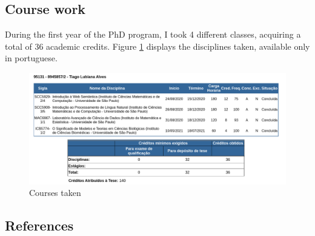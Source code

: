 \hypertarget{course-work}{%
\subsection{Course work}\label{course-work}}

During the first year of the PhD program, I took 4 different classes, acquiring a total of 36 academic credits.
Figure \ref{fig:courses_taken} displays the disciplines taken, available only in portuguese.

\begin{figure}
\hypertarget{fig:courses_taken}{%
\centering
\includegraphics{images/janus_courses_taken.png}
\caption{Courses taken}\label{fig:courses_taken}
}
\end{figure}

\hypertarget{references}{%
\subsection{References}\label{references}}

